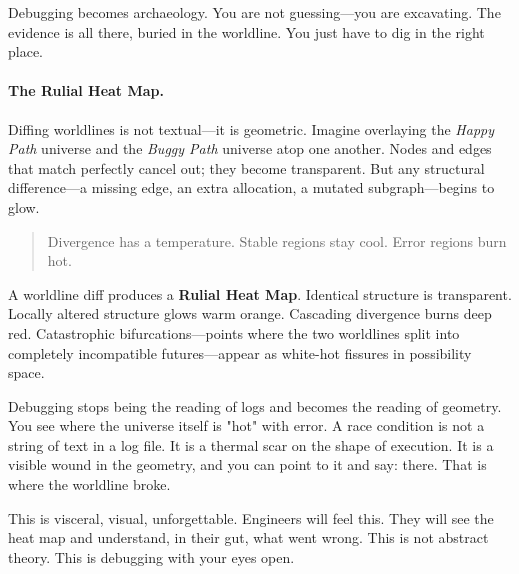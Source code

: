Debugging becomes archaeology. You are not guessing—you are excavating. The evidence is all there,
buried in the worldline. You just have to dig in the right place.

\paragraph{The Rulial Heat Map.}
Diffing worldlines is not textual—it is geometric. Imagine overlaying the \emph{Happy Path} universe
and the \emph{Buggy Path} universe atop one another. Nodes and edges that match perfectly cancel
out; they become transparent. But any structural difference—a missing edge, an extra allocation, a
mutated subgraph—begins to glow.

\begin{quote}
Divergence has a temperature. Stable regions stay cool. Error regions burn hot.
\end{quote}

A worldline diff produces a \textbf{Rulial Heat Map}. Identical structure is transparent. Locally
altered structure glows warm orange. Cascading divergence burns deep red. Catastrophic
bifurcations—points where the two worldlines split into completely incompatible futures—appear as
white-hot fissures in possibility space.

Debugging stops being the reading of logs and becomes the reading of geometry. You see where the
universe itself is "hot" with error. A race condition is not a string of text in a log file. It is a
thermal scar on the shape of execution. It is a visible wound in the geometry, and you can point to
it and say: there. That is where the worldline broke.

This is visceral, visual, unforgettable. Engineers will feel this. They will see the heat map and
understand, in their gut, what went wrong. This is not abstract theory. This is debugging with your
eyes open.

